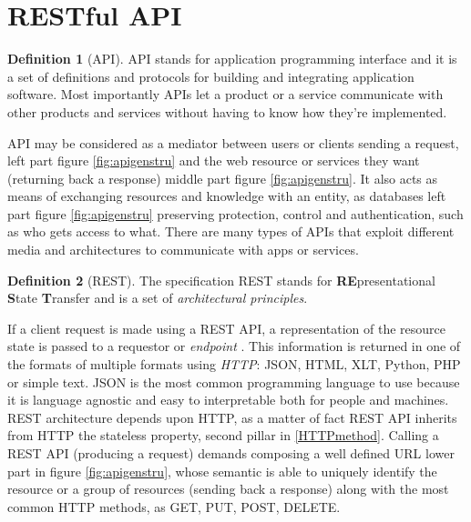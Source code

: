 \documentclass[
  12pt,
  a4paper,
  oneside]{book}
\theoremstyle{definition}
\newtheorem{definition}{Definition}[chapter]
\theoremstyle{definition}
\theoremstyle{definition}
\theoremstyle{remark}
\begin{document}
\hypertarget{restful-api}{%
\section{RESTful API}\label{restful-api}}

\begin{definition}[API]
\protect\hypertarget{def:api}{}{\label{def:api} {} }API stands for application programming interface and it is a set of definitions and protocols for building and integrating application software. Most importantly APIs let a product or a service communicate with other products and services without having to know how they're implemented.
\end{definition}
API may be considered as a mediator between users or clients sending a request, left part figure \ref{fig:apigenstru} and the web resource or services they want (returning back a response) middle part figure \ref{fig:apigenstru}. It also acts as means of exchanging resources and knowledge with an entity, as databases left part figure \ref{fig:apigenstru} preserving protection, control and authentication, such as who gets access to what.
There are many types of APIs that exploit different media and architectures to communicate with apps or services.
\begin{definition}[REST]
\protect\hypertarget{def:rest}{}{\label{def:rest} {} }The specification REST stands for \textbf{RE}presentational \textbf{S}tate \textbf{T}ransfer and is a set of \emph{architectural principles}.
\end{definition}

If a client request is made using a REST API, a representation of the resource state is passed to a requestor or \emph{endpoint} \citep{what_is_a_rest_api}. This information is returned in one of the formats of multiple formats using \emph{HTTP}: JSON, HTML, XLT, Python, PHP or simple text. JSON is the most common programming language to use because it is language agnostic \citeyearpar{what_is_a_rest_api} and easy to interpretable both for people and machines.
REST architecture depends upon HTTP, as a matter of fact REST API inherits from HTTP the stateless property, second pillar in \ref{HTTPmethod}. Calling a REST API (producing a request) demands composing a well defined URL lower part in figure \ref{fig:apigenstru}, whose semantic is able to uniquely identify the resource or a group of resources (sending back a response) along with the most common HTTP methods, as GET, PUT, POST, DELETE.
\end{document}
